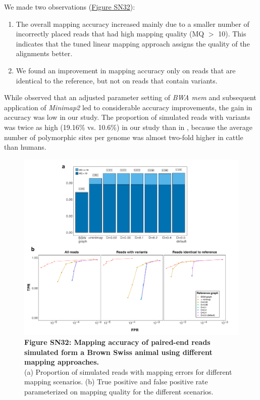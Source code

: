 \documentclass[../main.tex]{subfiles}
\begin{document}
\begin{flushleft}
\bigskip

We made two observations (\hyperlink{Figure SN32}{Figure SN32}):
\begin{enumerate}
    \item The overall mapping accuracy increased mainly due to a smaller number of incorrectly placed reads that had high mapping quality (MQ $>$ 10). This indicates that the tuned linear mapping approach assigns the quality of the alignments better.
    \item We found an improvement in mapping accuracy only on reads that are identical to the reference, but not on reads that contain variants.
\end{enumerate}

\bigskip

While \citet{grytten2020assessing} observed that an adjusted parameter setting of \emph{BWA mem} and subsequent application of \emph{Minimap2} led to considerable accuracy improvements, the gain in accuracy was low in our study. The proportion of simulated reads with variants was twice as high (19.16\% vs. 10.6\%) in our study than in \citet{grytten2020assessing}, because the average number of polymorphic sites per genome was almost two-fold higher in cattle than humans.


\begin{figure}[!htb]
    \centering
    \includegraphics[width=\textwidth]{paper2/supplement/roc_tuned_comb.pdf}
    \caption*{\textbf{\hypertarget{Figure SN32}{Figure SN32}: Mapping accuracy of paired-end reads simulated form a Brown Swiss
    animal using different mapping approaches.} \\
    \small{(a) Proportion of simulated reads with mapping errors for different mapping scenarios. (b) True positive and false positive rate parameterized on mapping quality for the different scenarios.}}
\end{figure}


\end{flushleft}
\end{document}
